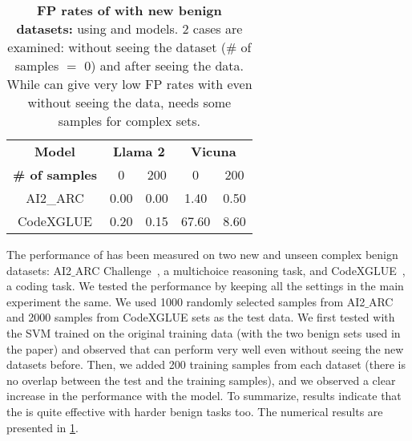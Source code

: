 \begin{table}[h]
\caption{\textbf{FP rates of \methodname{} with new benign datasets:} using \llama{} and \vicuna{} models. 2 cases are examined: without seeing the dataset (\# of samples $=$ 0) and after seeing the data. While \methodname{} can give very low FP rates with \llama{} even without seeing the data, \vicuna{} needs some samples for complex sets. }
\setlength{\tabcolsep}{6pt}
\vspace{5pt}
\begin{center}
\begin{small}
    \begin{tabular}{c cc  cc}
    \toprule
    \rowcolor{black!10}\textbf{Model}&  \multicolumn{2}{c}{\textbf{Llama 2}}  & \multicolumn{2}{c}{\textbf{Vicuna}}  \\
    \textbf{\# of samples}& 0 & 200  & 0 & 200 \\
    \midrule
\rowcolor{black!10}AI2\_ARC     & 0.00                       & 0.00                                    & 1.40                      & 0.50                                   \\
CodeXGLUE    & 0.20                       & 0.15                                  & 67.60                     & 8.60                                   \\
    \bottomrule
    \end{tabular}
\end{small}
\end{center}
\label{table:benign}
\end{table}

The performance of \methodname{} has been measured on two new and unseen complex benign datasets: AI2$\_$ARC Challenge~\citep{Yadav_2019}, a multichoice reasoning task, and CodeXGLUE~\citep{codexglue}, a coding task. We tested the performance by keeping all the settings in the main experiment the same. We used 1000 randomly selected samples from AI2$\_$ARC and 2000 samples from CodeXGLUE sets as the test data. We first tested with the SVM trained on the original training data (with the two benign sets used in the paper) and observed that \llama{} can perform very well even without seeing the new datasets before. Then, we added 200 training samples from each dataset (there is no overlap between the test and the training samples), and we observed a clear increase in the performance with the \vicuna{} model. To summarize, results indicate that the \methodname{} is quite effective with harder benign tasks too. The numerical results are presented in \cref{table:benign}.

